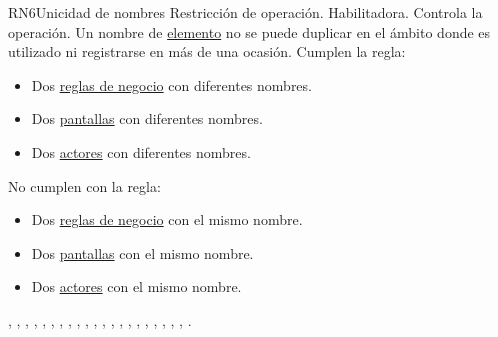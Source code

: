 \begin{BussinesRule}{RN6}{Unicidad de nombres}
	\BRitem[Tipo:] Restricción de operación. 
	\BRitem[Clase:] Habilitadora. 
	\BRitem[Nivel:] Controla la operación. %
	\BRitem[Descripción:] Un nombre de \hyperlink{tElemento}{elemento} no se puede duplicar en el ámbito donde es utilizado ni registrarse en más de una ocasión.
	 Cumplen la regla:
	\begin{itemize}
		\item Dos \hyperlink{BREntidad}{reglas de negocio} con diferentes nombres.
		\item Dos \hyperlink{EntidadPantalla}{pantallas} con diferentes nombres.
		\item Dos \hyperlink{actorEntidad}{actores} con diferentes nombres.
	\end{itemize}
	 No cumplen con la regla:
	\begin{itemize}
		\item Dos \hyperlink{BREntidad}{reglas de negocio} con el mismo nombre.
		\item Dos \hyperlink{EntidadPantalla}{pantallas} con el mismo nombre.
		\item Dos \hyperlink{actorEntidad}{actores} con el mismo nombre.
	\end{itemize}
	 , , , , , , , , , , , , , , , , , , , , , .
\end{BussinesRule}

